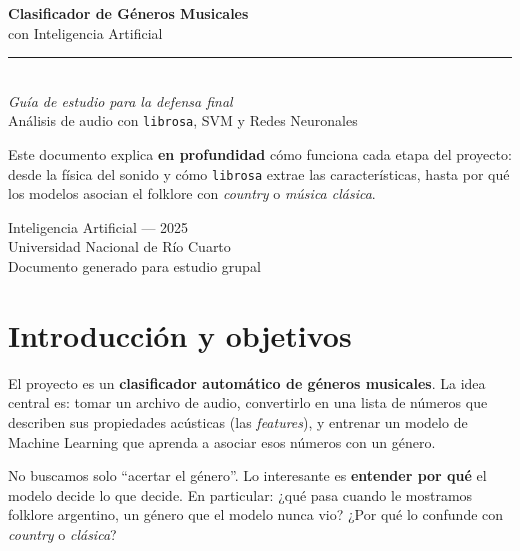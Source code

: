 \documentclass[11pt,a4paper]{article}
\newenvironment{ideabox}[1]{\begin{mdframed}[style=ideastyle,frametitle={#1}]}{\end{mdframed}}
\begin{document}
\begin{titlepage}
\centering
\vspace*{2cm}
{\Huge\bfseries\color{azulprof} Clasificador de Géneros Musicales}\\[0.4cm]
{\Large con Inteligencia Artificial}\\[1.2cm]
\rule{0.7\textwidth}{1.5pt}\\[0.6cm]
{\large\itshape Guía de estudio para la defensa final}\\[0.3cm]
{\large Análisis de audio con \texttt{librosa}, SVM y Redes Neuronales}\\[2cm]

\begin{mdframed}[linecolor=azulprof,backgroundcolor=azulclaro,linewidth=0.8pt,roundcorner=3pt,innermargin=0pt,leftmargin=30pt,rightmargin=30pt,innertopmargin=10pt,innerbottommargin=10pt]
\centering
Este documento explica \textbf{en profundidad} cómo funciona cada etapa del
proyecto: desde la física del sonido y cómo \texttt{librosa} extrae las
características, hasta por qué los modelos asocian el folklore con
\emph{country} o \emph{música clásica}.
\end{mdframed}

\vfill
{\large Inteligencia Artificial --- 2025}\\
{\normalsize Universidad Nacional de Río Cuarto}\\[0.5cm]
{\small Documento generado para estudio grupal}
\end{titlepage}

\tableofcontents
\newpage

\section{Introducción y objetivos}

El proyecto es un \textbf{clasificador automático de géneros musicales}. La idea
central es: tomar un archivo de audio, convertirlo en una lista de números que
describen sus propiedades acústicas (las \emph{features}), y entrenar un modelo
de Machine Learning que aprenda a asociar esos números con un género.

\begin{ideabox}{La pregunta de investigación}
No buscamos solo ``acertar el género''. Lo interesante es \textbf{entender por
qué} el modelo decide lo que decide. En particular: ¿qué pasa cuando le mostramos
folklore argentino, un género que el modelo nunca vio? ¿Por qué lo confunde con
\emph{country} o \emph{clásica}?
\end{ideabox}
\end{document}
